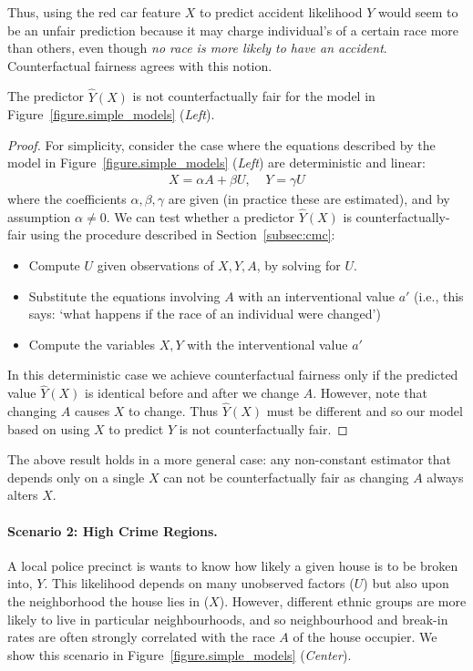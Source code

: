 Thus, using the red car feature $X$ to predict accident likelihood $Y$ would seem to be an unfair prediction because it may charge individual's of a certain race more than others, even though {\em no race is more likely to have an accident}. Counterfactual fairness agrees with this notion. 
%
\begin{lem}
The predictor $\hat{Y}(X)$ is not counterfactually fair for the model in Figure~\ref{figure.simple_models} (\emph{Left}).
\end{lem}
%
\begin{proof}
For simplicity, consider the case where the equations described by the model in Figure~\ref{figure.simple_models} (\emph{Left}) are deterministic and linear:
\begin{align}
X = \alpha A + \beta U, \;\;\;\; Y = \gamma U \nonumber
\end{align}
where the coefficients $\alpha,\beta,\gamma$ are given (in practice these are estimated), and by assumption $\alpha \neq 0$. We can test whether a predictor $\hat{Y}(X)$ is counterfactually-fair using the procedure described in Section~\ref{subsec:cmc}:
\begin{itemize}
\item Compute $U$ given observations of $X,Y,A$, by solving for $U$.
\item Substitute the equations involving $A$ with an interventional value $a'$ (i.e., this says: `what happens if the race of an individual were changed')
\item Compute the variables $X,Y$ with the interventional value $a'$
\end{itemize}
In this deterministic case we achieve counterfactual fairness only if the predicted value $\hat{Y}(X)$ is identical before and after we change $A$. However, note that changing $A$ causes $X$ to change. Thus $\hat{Y}(X)$ must be different and so our model based on using $X$ to predict $Y$ is not counterfactually fair.
\end{proof}
The above result holds in a more general case: any non-constant estimator that depends only on a single $X$ can not be counterfactually fair as changing $A$ always alters $X$.
%
%
\paragraph{Scenario 2: High Crime Regions.} 
A local police precinct is wants to know how likely a given house is to be broken into, $Y$. This likelihood depends on many unobserved factors
($U$) but also upon the neighborhood the house lies in ($X$). However, different ethnic groups are more likely to live in particular neighbourhoods, and so neighbourhood and break-in rates are often strongly correlated with the 
race $A$ of the house occupier. We show this scenario in Figure~\ref{figure.simple_models} (\emph{Center}).


